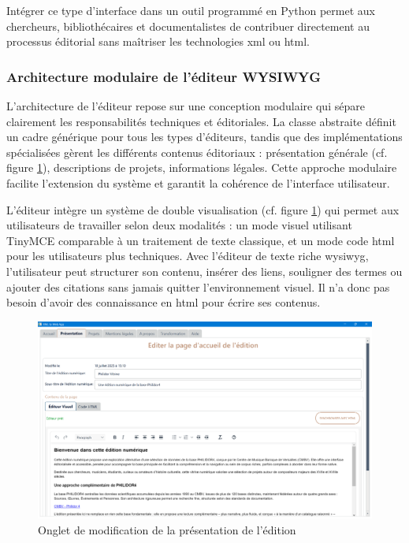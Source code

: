 Intégrer ce type d'interface dans un outil programmé en Python permet aux chercheurs, bibliothécaires et documentalistes de contribuer directement au processus éditorial sans maîtriser les technologies \gls{xml} ou \gls{html}.

\subsubsection{Architecture modulaire de l'éditeur WYSIWYG}

L'architecture de l'éditeur repose sur une conception modulaire qui sépare clairement les responsabilités techniques et éditoriales. La classe abstraite  définit un cadre générique pour tous les types d'éditeurs, tandis que des implémentations spécialisées gèrent les différents contenus éditoriaux : présentation générale (cf. figure \ref{appli-onglet-presentation}), descriptions de projets, informations légales. Cette approche modulaire facilite l'extension du système et garantit la cohérence de l'interface utilisateur.

L'éditeur intègre un système de double visualisation (cf. figure \ref{appli-onglet-presentation}) qui permet aux utilisateurs de travailler selon deux modalités : un mode visuel utilisant TinyMCE comparable à un traitement de texte classique, et un mode code \gls{html} pour les utilisateurs plus techniques. Avec l'éditeur de texte riche \gls{wysiwyg}, l’utilisateur peut structurer son contenu, insérer des liens, souligner des termes ou ajouter des citations sans jamais quitter l’environnement visuel. Il n'a donc pas besoin d'avoir des connaissance en \gls{html} pour écrire ses contenus.

\begin{figure}[h]
	\caption{Onglet de modification de la présentation de l'édition} \label{appli-onglet-presentation}
	\centering
	\includegraphics[width=\textwidth]{images/appli-onglet-presentation.png}
\end{figure}

